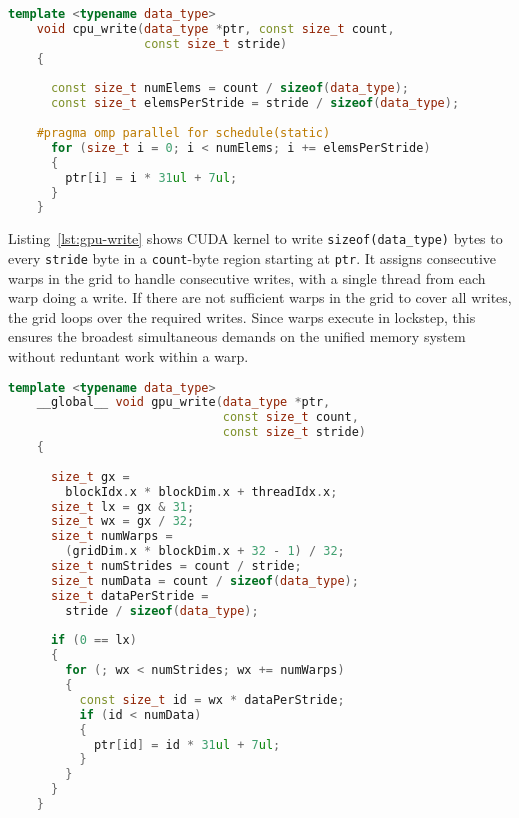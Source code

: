 \begin{lstlisting}[language=c++, caption=\texttt{cpu\_write} function for Algorithm~\ref{alg:um-coherence-bw}, label=lst:cpu-write]
    template <typename data_type>
    void cpu_write(data_type *ptr, const size_t count,
                   const size_t stride)
    {
    
      const size_t numElems = count / sizeof(data_type);
      const size_t elemsPerStride = stride / sizeof(data_type);
    
    #pragma omp parallel for schedule(static)
      for (size_t i = 0; i < numElems; i += elemsPerStride)
      {
        ptr[i] = i * 31ul + 7ul;
      }
    }
\end{lstlisting}

Listing~\ref{lst:gpu-write} shows CUDA kernel to write \texttt{sizeof(data\_type)} bytes to every \texttt{stride} byte in a \texttt{count}-byte region starting at \texttt{ptr}.
It assigns consecutive warps in the grid to handle consecutive writes, with a single thread from each warp doing a write.
If there are not sufficient warps in the grid to cover all writes, the grid loops over the required writes.
Since warps execute in lockstep, this ensures the broadest simultaneous demands on the unified memory system without reduntant work within a warp.

\begin{lstlisting}[language=c++, caption=\texttt{gpu\_write} function for Algorithm~\ref{alg:um-coherence-bw}, label=lst:gpu-write]
    template <typename data_type>
    __global__ void gpu_write(data_type *ptr,
                              const size_t count,
                              const size_t stride)
    {
    
      size_t gx = 
        blockIdx.x * blockDim.x + threadIdx.x;
      size_t lx = gx & 31;
      size_t wx = gx / 32;
      size_t numWarps = 
        (gridDim.x * blockDim.x + 32 - 1) / 32;
      size_t numStrides = count / stride;
      size_t numData = count / sizeof(data_type);
      size_t dataPerStride = 
        stride / sizeof(data_type);
    
      if (0 == lx)
      {
        for (; wx < numStrides; wx += numWarps)
        {
          const size_t id = wx * dataPerStride;
          if (id < numData)
          {
            ptr[id] = id * 31ul + 7ul;
          }
        }
      }
    }
\end{lstlisting}

